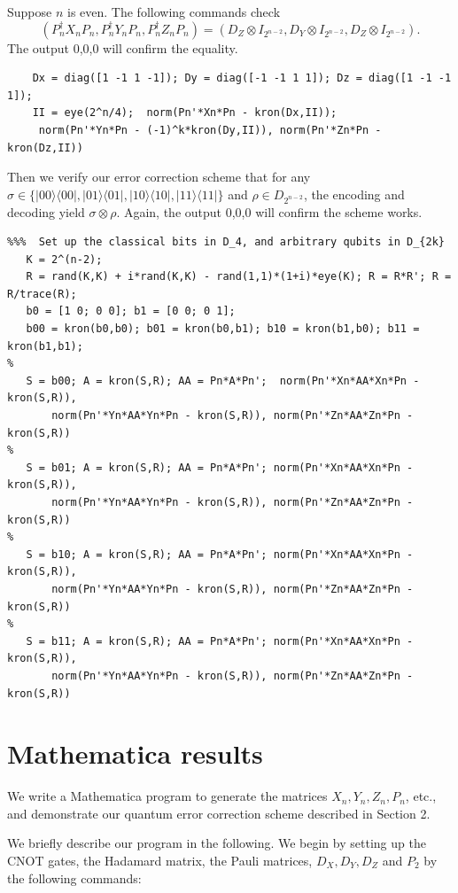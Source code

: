 \documentclass[11pt]{article}
\def\ra{{\rangle}}
\def\la{{\langle}}
\begin{document}
Suppose $n$ is even. The following commands check
\begin{equation}\label{even}
(P_n^\dag X_n P_n,P_n^\dag Y_n P_n,P_n^\dag Z_n P_n) = 
(D_Z \otimes I_{2^{n-2}},D_Y \otimes I_{2^{n-2}}, D_Z \otimes I_{2^{n-2}}).\end{equation}
The output 0,0,0 will confirm the equality.
\begin{verbatim}
    Dx = diag([1 -1 1 -1]); Dy = diag([-1 -1 1 1]); Dz = diag([1 -1 -1 1]);
    II = eye(2^n/4);  norm(Pn'*Xn*Pn - kron(Dx,II)); 
     norm(Pn'*Yn*Pn - (-1)^k*kron(Dy,II)), norm(Pn'*Zn*Pn - kron(Dz,II))
\end{verbatim}
Then we verify our error correction scheme that for any $\sigma \in \{|00\ra\la 00|,
|01\ra\la 01|,|10\ra\la 10|,|11\ra\la 11|\}$ and $\rho \in D_{2^{n-2}}$,
the encoding and decoding yield $\sigma \otimes \rho$. Again, the output 0,0,0
will confirm the scheme works.
\begin{verbatim}
%%%  Set up the classical bits in D_4, and arbitrary qubits in D_{2k}
   K = 2^(n-2); 
   R = rand(K,K) + i*rand(K,K) - rand(1,1)*(1+i)*eye(K); R = R*R'; R = R/trace(R);
   b0 = [1 0; 0 0]; b1 = [0 0; 0 1]; 
   b00 = kron(b0,b0); b01 = kron(b0,b1); b10 = kron(b1,b0); b11 = kron(b1,b1);
%
   S = b00; A = kron(S,R); AA = Pn*A*Pn';  norm(Pn'*Xn*AA*Xn*Pn - kron(S,R)),
       norm(Pn'*Yn*AA*Yn*Pn - kron(S,R)), norm(Pn'*Zn*AA*Zn*Pn - kron(S,R))
%
   S = b01; A = kron(S,R); AA = Pn*A*Pn'; norm(Pn'*Xn*AA*Xn*Pn - kron(S,R)), 
       norm(Pn'*Yn*AA*Yn*Pn - kron(S,R)), norm(Pn'*Zn*AA*Zn*Pn - kron(S,R))
%
   S = b10; A = kron(S,R); AA = Pn*A*Pn'; norm(Pn'*Xn*AA*Xn*Pn - kron(S,R)), 
       norm(Pn'*Yn*AA*Yn*Pn - kron(S,R)), norm(Pn'*Zn*AA*Zn*Pn - kron(S,R))
%
   S = b11; A = kron(S,R); AA = Pn*A*Pn'; norm(Pn'*Xn*AA*Xn*Pn - kron(S,R)), 
       norm(Pn'*Yn*AA*Yn*Pn - kron(S,R)), norm(Pn'*Zn*AA*Zn*Pn - kron(S,R))
\end{verbatim}



\section{Mathematica results}

We write a Mathematica program to generate the matrices 
$X_n, Y_n, Z_n, P_n$, etc.,  and demonstrate our quantum error 
correction scheme described in Section 2.   

We briefly describe our program in the following.
We begin by setting up the CNOT gates, the Hadamard matrix, the Pauli matrices, $D_X,D_Y,D_Z$ and $P_2$ by the
following commands:
\end{document}
